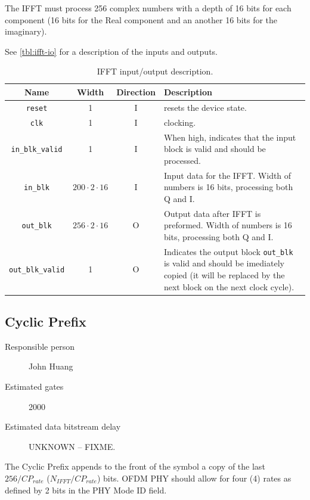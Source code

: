 \documentclass[dvips,10pt,twocolumn]{article}
\newcommand{\wire}{\texttt}
\begin{document}
The IFFT must process 256 complex numbers with a depth of 16 bits for each
component (16 bits for the Real component and an another 16 bits for the
imaginary).

See \autoref{tbl:ifft-io} for a description of the inputs and outputs.

\begin{table} \begin{tabularx}{\textwidth}{c|c|c|X}
	\label{tbl:ifft-io}
	
	Name & Width & Direction & Description \\ \hline

	\wire{reset} & 1 & I & resets the device state. \\

	\wire{clk}   & 1 & I & clocking. \\

	\wire{in\_blk\_valid} & 1 & I & When high, indicates that the input block is
	valid and should be processed. \\

	\wire{in\_blk} & $200 \cdot 2 \cdot 16$ & I & Input data for the IFFT. Width of
	numbers is 16 bits, processing both Q and I. \\

	\wire{out\_blk} & $256 \cdot 2 \cdot 16$ & O & Output data after IFFT is preformed. Width of
	numbers is 16 bits, processing both Q and I. \\

	\wire{out\_blk\_valid} & 1 & O & Indicates the output block
	\wire{out\_blk} is valid and should be imediately copied (it will be
	replaced by the next block on the next clock cycle).

\end{tabularx}
\caption{IFFT input/output description.}
\end{table}


\subsection{Cyclic Prefix}
\label{sec:cyclic_prefix}
\begin{description}
	\item[Responsible person] John Huang
	\item[Estimated gates] 2000
	\item[Estimated data bitstream delay] UNKNOWN -- FIXME.
\end{description}
	
The Cyclic Prefix appends to the front of the symbol a copy of the last
$256/CP_{rate}$ ($N_{IFFT}/CP_{rate}$) bits. OFDM PHY should allow for four
(4) rates as defined by 2 bits in the PHY Mode ID field. 
\end{document}
